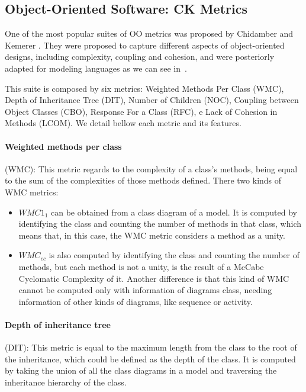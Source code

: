 \subsection{Object-Oriented Software: \textrm{CK} Metrics}
One of the most popular suites of OO metrics was proposed by Chidamber and Kemerer \cite{Chidamber:1994:MSO:630808.631131}.
They were proposed to capture different aspects of object-oriented designs, including complexity, coupling and cohesion,
and were posteriorly adapted for modeling languages as we can see in~\cite{Power2}.

This suite is composed by six metrics: Weighted Methods Per Class (WMC), Depth of Inheritance Tree (DIT), Number of Children (NOC), Coupling between Object Classes (CBO), Response For a Class (RFC), e Lack of Cohesion in Methods (LCOM).
We detail bellow each metric and its features.\\

\paragraph{Weighted methods per class} (WMC): This metric regards to the complexity of a class's methods, being equal to the sum of the complexities of those methods defined. There two kinds of WMC metrics:
\begin{itemize}
\item \textbf{$WMC1_{1}$} can be obtained from a class diagram of a \umlS model. It is computed by identifying the class and counting the number of methods in that class, which means that, in this case, the WMC metric considers a method as a unity.
\item \textbf{$WMC_{cc}$} is also computed by identifying the class and counting the number of methods, but each method is not a unity, is the result of a McCabe Cyclomatic Complexity of it. Another difference is that this kind of WMC cannot be computed only with information of diagrams class, needing information of other kinds of diagrams, like sequence or activity.
\end{itemize}

\paragraph{Depth of inheritance tree} (DIT): This metric is equal to the maximum length from the class to the root of the inheritance, which could be defined as the depth of the class. It is computed by taking the union of all the class diagrams in a \umlS model and traversing the inheritance hierarchy of the class.

